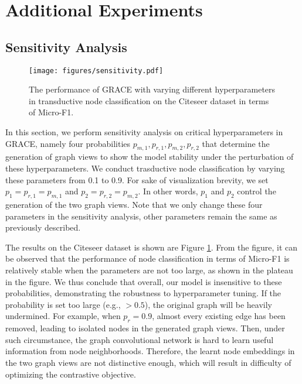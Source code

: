 \documentclass{article}
\theoremstyle{remark}
\begin{document}
\section{Additional Experiments}
\label{appendix:experiments}

\subsection{Sensitivity Analysis}
\label{appendix:sensitivity}

\begin{figure}[b]
	\centering
	\texttt{[image: figures/sensitivity.pdf]}
	\caption{The performance of GRACE with varying different hyperparameters in transductive node classification on the Citeseer dataset in terms of Micro-F1.}
	\label{fig:sensitivity-analysis}
\end{figure}

In this section, we perform sensitivity analysis on critical hyperparameters in GRACE, namely four probabilities \(p_{m,1},p_{r,1},p_{m,2},p_{r,2}\) that determine the generation of graph views to show the model stability under the perturbation of these hyperparameters.
We conduct trasductive node classification by varying these parameters from 0.1 to 0.9. For sake of visualization brevity, we set \(p_1 = p_{r,1} = p_{m,1}\) and \(p_2 = p_{r,2} = p_{m,2}\). In other words, \(p_1\) and \(p_2\) control the generation of the two graph views. Note that we only change these four parameters in the sensitivity analysis, other parameters remain the same as previously described.

The results on the Citeseer dataset is shown are Figure \ref{fig:sensitivity-analysis}.
From the figure, it can be observed that the performance of node classification in terms of Micro-F1 is relatively stable when the parameters are not too large, as shown in the plateau in the figure. We thus conclude that overall, our model is insensitive to these probabilities, demonstrating the robustness to hyperparameter tuning.
If the probability is set too large (e.g., \(> 0.5\)), the original graph will be heavily undermined. For example, when \(p_r = 0.9\), almost every existing edge has been removed, leading to isolated nodes in the generated graph views. Then, under such circumstance, the graph convolutional network is hard to learn useful information from node neighborhoods. Therefore, the learnt node embeddings in the two graph views are not distinctive enough, which will result in difficulty of optimizing the contrastive objective.
\end{document}
